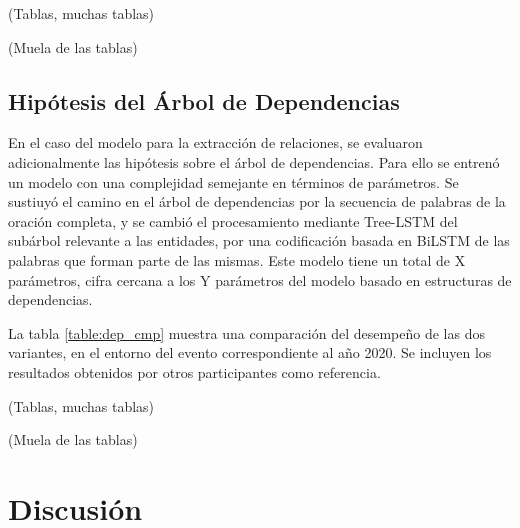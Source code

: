 (Tablas, muchas tablas)

(Muela de las tablas)

\subsection{Hipótesis del Árbol de Dependencias}

En el caso del modelo para la extracción de relaciones, se evaluaron adicionalmente las hipótesis sobre el árbol de dependencias.
Para ello se entrenó un modelo con una complejidad semejante en términos de parámetros.
Se sustiuyó el camino en el árbol de dependencias por la secuencia de palabras de la oración completa, y se cambió el procesamiento mediante Tree-LSTM del subárbol relevante a las entidades, por una codificación basada en BiLSTM de las palabras que forman parte de las mismas.
Este modelo tiene un total de X parámetros, cifra cercana a los Y parámetros del modelo basado en estructuras de dependencias.

La tabla \ref{table:dep_cmp} muestra una comparación del desempeño de las dos variantes, en el entorno del evento correspondiente al año 2020. Se incluyen los resultados obtenidos por otros participantes como referencia.

(Tablas, muchas tablas)

(Muela de las tablas)


\section{Discusión}
